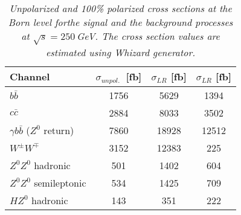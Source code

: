        \begin{table}[H]
        \begin{center}
        \begin{tabular}{l c c c}
        \hline
	Channel & $\sigma_{unpol.}$\ [fb] & $\sigma_{LR}$ [fb] &  $\sigma_{LR}$ [fb] \\
	\hline
	$b\bar{b}$ & 1756 & 5629 & 1394 \\
	\hline
	$c\bar{c}$ & 2884 & 8033 & 3502 \\
	$\gamma b\bar{b}$ ($Z^0$ return) & 7860 & 18928 & 12512 \\
	$W^\pm W^\mp $ &3152&12383&225 \\ 
	$Z^0Z^0$ hadronic &501 & 1402 & 604 \\
	$Z^0Z^0$ semileptonic  &534 & 1425 & 709\\
	$HZ^0$ hadronic  &143 & 351 & 222 \\
        \hline
        \end{tabular}
        \end{center}
        \caption{\sl Unpolarized and 100\% polarized cross sections at the Born level forthe  signal and the background processes at $\sqrt{s}=250$\,GeV. The cross section values are estimated using Whizard generator.}
        \label{table:bbbarsigma}
        \end{table}
